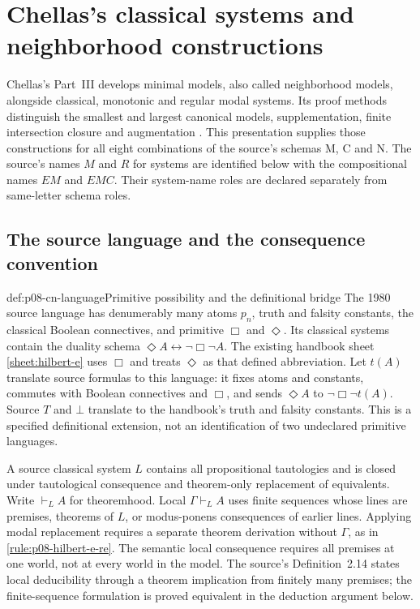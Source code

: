 \section{Chellas's classical systems and neighborhood constructions}
\label{sec:p08-n-b-006-03}

Chellas's Part~III develops minimal models, also called neighborhood
models, alongside classical, monotonic and regular modal systems.
Its proof methods distinguish the smallest and largest canonical
models, supplementation, finite intersection closure and augmentation
\cite[chaps.~7--9, pp.~207--267]{Chellas1980}.
This presentation supplies those constructions for all eight combinations
of the source's schemas M, C and N. The source's names \(M\) and \(R\)
for systems are identified below with the compositional names \(EM\)
and \(EMC\). Their system-name roles are declared separately
from same-letter schema roles.

\subsection{The source language and the consequence convention}
\label{sec:p08-cn-language}

\begin{hbdefinition}{def:p08-cn-language}{Primitive possibility and the definitional bridge}
The 1980 source language has denumerably many atoms \(p_n\), truth
and falsity constants, the classical Boolean connectives, and primitive
\(\Box\) and \(\Diamond\). Its classical systems contain the
duality schema \(\Diamond A\leftrightarrow\neg\Box\neg A\).
The existing handbook sheet \ref{sheet:hilbert-e} uses \(\Box\)
and treats \(\Diamond\) as that defined abbreviation.
Let \(t(A)\) translate source formulas to this language: it fixes
atoms and constants, commutes with Boolean connectives and \(\Box\),
and sends \(\Diamond A\) to \(\neg\Box\neg t(A)\).
Source \(T\) and \(\bot\) translate to the handbook's truth and
falsity constants. This is a specified definitional extension, not an
identification of two undeclared primitive languages.

A source classical system \(L\) contains all propositional
tautologies and is closed under tautological consequence and
theorem-only replacement of equivalents. Write \(\vdash_L A\)
for theoremhood. Local \(\Gamma\vdash_L A\) uses finite
sequences whose lines are premises, theorems of \(L\), or
modus-ponens consequences of earlier lines. Applying modal replacement
requires a separate theorem derivation without \(\Gamma\), as in
\ref{rule:p08-hilbert-e-re}. The semantic local consequence requires
all premises at one world, not at every world in the model.
The source's Definition~2.14 states local deducibility through a
theorem implication from finitely many premises; the finite-sequence
formulation is proved equivalent in the deduction argument below.
\end{hbdefinition}


